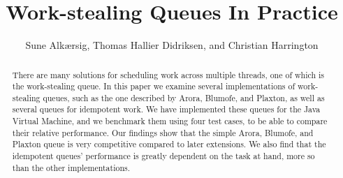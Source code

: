 \documentclass[oribibl]{llncs}
\begin{document}
\mainmatter{}
\title{Work-stealing Queues In Practice}
\author{Sune Alk\ae{}rsig, Thomas Hallier Didriksen, and Christian Harrington \\
}

\maketitle

\begin{abstract}
There are many solutions for scheduling work across multiple threads, one of which is the work-stealing queue. 
In this paper we examine several implementations of work-stealing queues, such as the one described by Arora, Blumofe, and Plaxton, as well as several queues for idempotent work.
We have implemented these queues for the Java Virtual Machine, and we benchmark them using four test cases, to be able to compare their relative performance.
Our findings show that the simple Arora, Blumofe, and Plaxton queue is very competitive compared to later extensions.
We also find that the idempotent queues' performance is greatly dependent on the task at hand, more so than the other implementations.

\end{abstract}













\appendix


\end{document}
